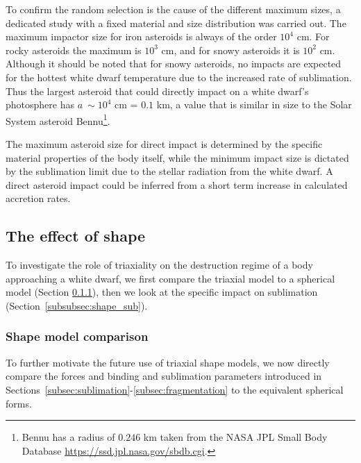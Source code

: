 \documentclass[fleqn,usenatbib]{mnras}
\begin{document}
To confirm the random selection is the cause of the different maximum sizes, a dedicated study with a fixed material and size distribution was carried out. 
The maximum impactor size for iron asteroids is always of the order $10^4$ cm.
For rocky asteroids the maximum is $10^3$ cm, and for snowy asteroids it is $10^2$ cm.
Although it should be noted that for snowy asteroids, no impacts are expected for the hottest white dwarf temperature due to the increased rate of sublimation.
Thus the largest asteroid that could directly impact on a white dwarf's photosphere has $a ~\sim 10^4$ cm = $0.1$ km, a value that is similar in size to the Solar System asteroid Bennu\footnote{Bennu has a radius of $0.246$ km taken from the NASA JPL Small Body Database \url{https://ssd.jpl.nasa.gov/sbdb.cgi}.}.

The maximum asteroid size for direct impact is determined by the specific material properties of the body itself, while the minimum impact size is dictated by the sublimation limit due to the stellar radiation from the white dwarf.
A direct asteroid impact could be inferred from a short term increase in calculated accretion rates. 

\subsection{The effect of shape}
To investigate the role of triaxiality on the destruction regime of a body approaching a white dwarf, we first compare the triaxial model to a spherical model (Section \ref{subsubsec:model_compar}), then we look at the specific impact on sublimation (Section~\ref{subsubsec:shape_sub}).

\subsubsection{Shape model comparison} \label{subsubsec:model_compar}
To further motivate the future use of triaxial shape models, we now directly compare the forces and binding and sublimation parameters introduced in Sections~\ref{subsec:sublimation}-\ref{subsec:fragmentation} to the equivalent spherical forms.
\end{document}
